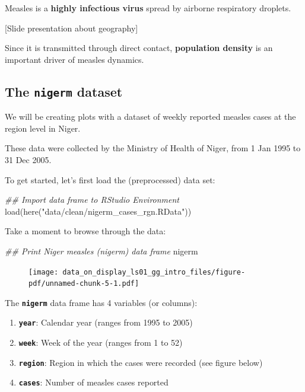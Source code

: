 \documentclass[
  letterpaper,
  DIV=11,
  numbers=noendperiod]{scrreprt}
\newenvironment{Shaded}{\begin{snugshade}}{\end{snugshade}}
\newcommand{\DocumentationTok}[1]{\textcolor[rgb]{0.37,0.37,0.37}{\textit{#1}}}
\newcommand{\FunctionTok}[1]{\textcolor[rgb]{0.28,0.35,0.67}{#1}}
\newcommand{\NormalTok}[1]{\textcolor[rgb]{0.00,0.23,0.31}{#1}}
\newcommand{\StringTok}[1]{\textcolor[rgb]{0.13,0.47,0.30}{#1}}
\begin{document}
Measles is a \textbf{highly infectious virus} spread by airborne
respiratory droplets.

{[}Slide presentation about geography{]}

Since it is transmitted through direct contact, \textbf{population
density} is an important driver of measles dynamics.

\hypertarget{the-nigerm-dataset}{%
\subsection{\texorpdfstring{The \texttt{nigerm}
dataset}{The nigerm dataset}}\label{the-nigerm-dataset}}

We will be creating plots with a dataset of weekly reported measles
cases at the region level in Niger.

These data were collected by the Ministry of Health of Niger, from 1 Jan
1995 to 31 Dec 2005.

To get started, let's first load the (preprocessed) data set:

\begin{Shaded}
\begin{Highlighting}[]
\DocumentationTok{\#\# Import data frame to RStudio Environment}
\FunctionTok{load}\NormalTok{(}\FunctionTok{here}\NormalTok{(}\StringTok{"data/clean/nigerm\_cases\_rgn.RData"}\NormalTok{))}
\end{Highlighting}
\end{Shaded}

Take a moment to browse through the data:

\begin{Shaded}
\begin{Highlighting}[]
\DocumentationTok{\#\# Print Niger measles (nigerm) data frame}
\NormalTok{nigerm}
\end{Highlighting}
\end{Shaded}

\begin{figure}[H]

{\centering \texttt{[image: data\_on\_display\_ls01\_gg\_intro\_files/figure-pdf/unnamed-chunk-5-1.pdf]}

}

\end{figure}

The \textbf{\texttt{nigerm}} data frame has 4 variables (or columns):

\begin{enumerate}
\def\labelenumi{\arabic{enumi}.}
\item
  \textbf{\texttt{year}}: Calendar year (ranges from 1995 to 2005)
\item
  \textbf{\texttt{week}}: Week of the year (ranges from 1 to 52)
\item
  \textbf{\texttt{region}}: Region in which the cases were recorded (see
  figure below)
\item
  \textbf{\texttt{cases}}: Number of measles cases reported
\end{enumerate}
\end{document}
